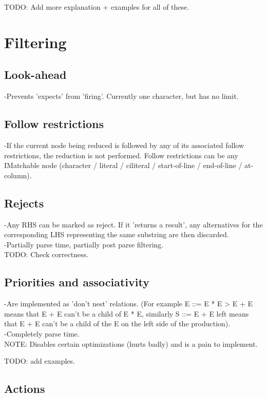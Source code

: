 \documentclass[a4paper,10pt]{article}
\begin{document}
TODO: Add more explanation + examples for all of these.

\section{Filtering}

\subsection{Look-ahead}

-Prevents 'expects' from 'firing'. Currently one character, but has no limit.

\subsection{Follow restrictions}

-If the current node being reduced is followed by any of its associated follow restrictions, the reduction is not performed. Follow restrictions can be any IMatchable node (character / literal / ciliteral / start-of-line / end-of-line / at-column).

\subsection{Rejects}

-Any RHS can be marked as reject. If it 'returns a result', any alternatives for the corresponding LHS representing the same substring are then discarded.\\
-Partially parse time, partially post parse filtering. \\
TODO: Check correctness.

\subsection{Priorities and associativity}

-Are implemented as 'don't nest' relations. (For example E ::= E * E > E + E means that E + E can't be a child of E * E, similarly S ::= E + E {left} means that E + E can't be a child of the E on the left side of the production).\\
-Completely parse time.\\
NOTE: Disables certain optimizations (hurts badly) and is a pain to implement.

TODO: add examples.

\subsection{Actions}
\end{document}

